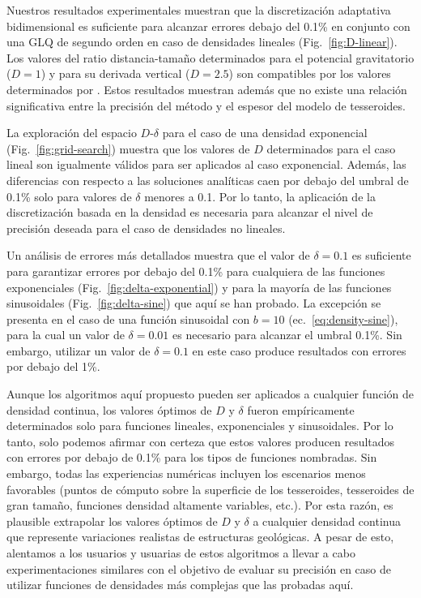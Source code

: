 Nuestros resultados experimentales muestran que la discretización adaptativa
bidimensional es suficiente para alcanzar errores debajo del 0.1\% en conjunto
con una \ac{GLQ} de segundo orden en caso de densidades lineales
(Fig.~\ref{fig:D-linear}).
Los valores del ratio distancia-tamaño determinados para el
potencial gravitatorio
($D=1$)
y para su derivada vertical ($D=2.5$) son compatibles por los valores
determinados por \citet{uieda2016}.
Estos resultados muestran además que no existe una relación significativa entre
la precisión del método y el espesor del modelo de tesseroides.

La exploración del espacio $D$-$\delta$ para el caso de una densidad
exponencial (Fig.~\ref{fig:grid-search}) muestra que los valores de $D$
determinados para el caso lineal son igualmente válidos para ser aplicados al
caso exponencial.
Además, las diferencias con respecto a las soluciones analíticas caen por
debajo del umbral de 0.1\% solo para valores de $\delta$ menores a 0.1.
Por lo tanto, la aplicación de la discretización basada en la densidad es
necesaria para alcanzar el nivel de precisión deseada para el caso de
densidades no lineales.

Un análisis de errores más detallados muestra que el valor de $\delta = 0.1$ es
suficiente para garantizar errores por debajo del 0.1\% para cualquiera de las
funciones exponenciales (Fig.~\ref{fig:delta-exponential}) y para la mayoría de
las funciones sinusoidales (Fig.~\ref{fig:delta-sine}) que aquí se han probado.
La excepción se presenta en el caso de una función sinusoidal con $b = 10$
(ec.~\ref{eq:density-sine}),
para la cual un valor de $\delta = 0.01$ es necesario para alcanzar el umbral
0.1\%.
Sin embargo, utilizar un valor de $\delta = 0.1$ en este caso produce
resultados con errores por debajo del 1\%.

Aunque los algoritmos aquí propuesto pueden ser aplicados a cualquier función
de densidad continua, los valores óptimos de $D$ y $\delta$ fueron
empíricamente determinados solo para funciones lineales, exponenciales
y sinusoidales.
Por lo tanto, solo podemos afirmar con certeza que estos valores producen
resultados con errores por debajo de 0.1\% para los tipos de funciones
nombradas.
Sin embargo, todas las experiencias numéricas incluyen los escenarios menos
favorables (puntos de cómputo sobre la superficie de los tesseroides,
tesseroides de gran tamaño, funciones densidad altamente variables, etc.).
Por esta razón, es plausible extrapolar los valores óptimos de $D$ y $\delta$
a cualquier densidad continua que represente variaciones realistas de
estructuras geológicas.
A pesar de esto, alentamos a los usuarios y usuarias de estos algoritmos
a llevar a cabo experimentaciones similares con el objetivo de evaluar su
precisión en caso de utilizar funciones de densidades más complejas que las
probadas aquí.

